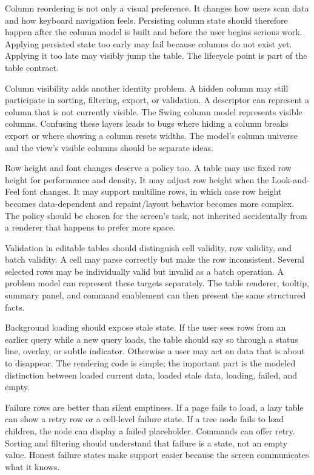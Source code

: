 Column reordering is not only a visual preference. It changes how users scan data and how keyboard navigation feels. Persisting column state should therefore happen after the column model is built and before the user begins serious work. Applying persisted state too early may fail because columns do not exist yet. Applying it too late may visibly jump the table. The lifecycle point is part of the table contract.

Column visibility adds another identity problem. A hidden column may still participate in sorting, filtering, export, or validation. A descriptor can represent a column that is not currently visible. The Swing column model represents visible columns. Confusing these layers leads to bugs where hiding a column breaks export or where showing a column resets widths. The model's column universe and the view's visible columns should be separate ideas.

Row height and font changes deserve a policy too. A table may use fixed row height for performance and density. It may adjust row height when the Look-and-Feel font changes. It may support multiline rows, in which case row height becomes data-dependent and repaint/layout behavior becomes more complex. The policy should be chosen for the screen's task, not inherited accidentally from a renderer that happens to prefer more space.

Validation in editable tables should distinguish cell validity, row validity, and batch validity. A cell may parse correctly but make the row inconsistent. Several selected rows may be individually valid but invalid as a batch operation. A problem model can represent these targets separately. The table renderer, tooltip, summary panel, and command enablement can then present the same structured facts.

Background loading should expose stale state. If the user sees rows from an earlier query while a new query loads, the table should say so through a status line, overlay, or subtle indicator. Otherwise a user may act on data that is about to disappear. The rendering code is simple; the important part is the modeled distinction between loaded current data, loaded stale data, loading, failed, and empty.

Failure rows are better than silent emptiness. If a page fails to load, a lazy table can show a retry row or a cell-level failure state. If a tree node fails to load children, the node can display a failed placeholder. Commands can offer retry. Sorting and filtering should understand that failure is a state, not an empty value. Honest failure states make support easier because the screen communicates what it knows.

